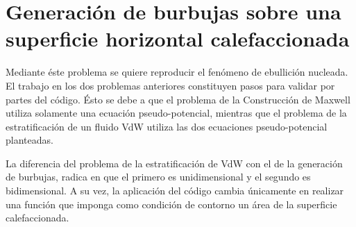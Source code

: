 %
%
%
%
%
%
%
%

\newpage
\section{Generación de burbujas sobre una superficie horizontal calefaccionada}

Mediante éste problema se quiere reproducir el fenómeno de ebullición nucleada. El trabajo en los dos problemas anteriores constituyen pasos para validar por partes del código. Ésto se debe a que el problema de la Construcción de Maxwell utiliza solamente una ecuación pseudo-potencial, mientras que el problema de la estratificación de un fluido VdW utiliza las dos ecuaciones pseudo-potencial planteadas.

La diferencia del problema de la estratificación de VdW con el de la generación de burbujas, radica en que el primero es unidimensional y el segundo es bidimensional. A su vez, la aplicación del código cambia únicamente en realizar una función que imponga como condición de contorno un área de la superficie calefaccionada.

